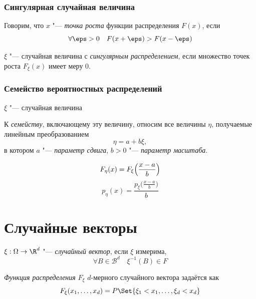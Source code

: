 \subsubsection{Сингулярная случайная величина}

\begin{definition}
	Говорим, что $ x $ "--- \emph{точка роста} функции распределения $ F(x) $, если
	$$ \forall \eps > 0 \quad F(x + \eps) > F(x - \eps) $$
\end{definition}

\begin{definition}
	$ \xi $ "--- случайная величина с \emph{сингулярным распределением}, если множество точек роста
	$ F_\xi(x) $ имеет меру 0.
\end{definition}

\subsubsection{Семейство вероятностных распределений}

\begin{definition}
	$ \xi $ "--- случайная величина

	К \emph{семейству}, включающему эту величину, относим все величины $ \eta $, получаемые линейным
	преобразованием
	$$ \eta = a + b \xi, $$
	в котором $ a $ "--- \emph{параметр сдвига}, $ b > 0 $ "--- \emph{параметр масштаба}.

	$$ F_\eta(x) = F_\xi \Bigl( \frac{x - a}b \Bigr) $$
	$$ p_\eta(x) = \frac{p_\xi \bigl( \frac{x - a}b \bigr)}b $$
\end{definition}

\section{Случайные векторы}

\begin{definition}
	$ \xi : \Omega \to \R^d $ "--- \emph{случайный вектор}, если $ \xi $ измерима, \ie
	$$ \forall B \in \mathcal B^d \quad \xi^{-1}(B) \in F $$
\end{definition}

\begin{definition}
	\emph{Функция распределения} $ F_\xi $ $ d $-мерного случайного вектора задаётся как
	$$ F_\xi(x_1, \dots, x_d) = P\Set{\xi_1 < x_1, \dots, \xi_d < x_d} $$
\end{definition}

